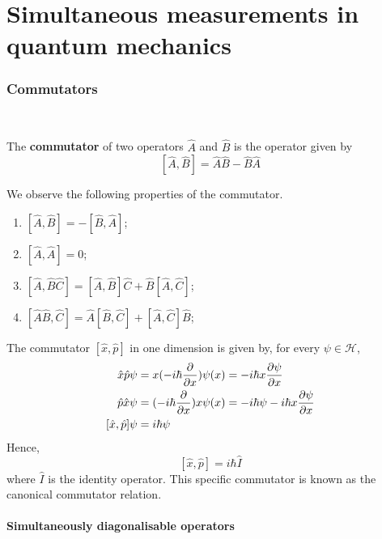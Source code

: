 \documentclass[a4paper,11pt]{article}
\begin{document}
\clearpage
\part{Simultaneous measurements in quantum mechanics}

\section{Commutators}
\ \vspace{-1.5em}

\begin{definition}
	The \textbf{commutator} of two operators \( \hat A \) and \( \hat B \) is the operator given by
	\[
		[\hat A, \hat B] = \hat A \hat B - \hat B \hat A
	\]
\end{definition}

We observe the following properties of the commutator.
\begin{enumerate}
	\item \( [\hat A, \hat B] = -[\hat B, \hat A] \);
	\item \( [\hat A, \hat A] = 0 \);
	\item \( [\hat A, \hat B \hat C] = [\hat A, \hat B] \hat C + \hat B [\hat A, \hat C] \);
	\item \( [\hat A \hat B, \hat C] = \hat A [\hat B, \hat C] + [\hat A, \hat C] \hat B \);
\end{enumerate}
\begin{example}
	The commutator \( [\hat x, \hat p] \) in one dimension is given by, for every \( \psi \in \mathcal H \),
	\begin{align*}
		\hat x \hat p \psi                   & = x (-i\hbar \pdv{x}) \psi(x) = -i\hbar x \pdv{\psi}{x}                 \\
		\hat p \hat x \psi                   & = (-i\hbar \pdv{x}) x \psi(x) = -i \hbar \psi - i \hbar x \pdv{\psi}{x} \\
		[\hat x, \hat p] \psi & = i \hbar \psi
	\end{align*}
	Hence,
	\[
		[\hat x, \hat p] = i \hbar \hat I
	\]
	where \( \hat I \) is the identity operator.
	This specific commutator is known as the canonical commutator relation.
\end{example}

\subsection{Simultaneously diagonalisable operators}\ \vspace*{-1.5em}
\end{document}
